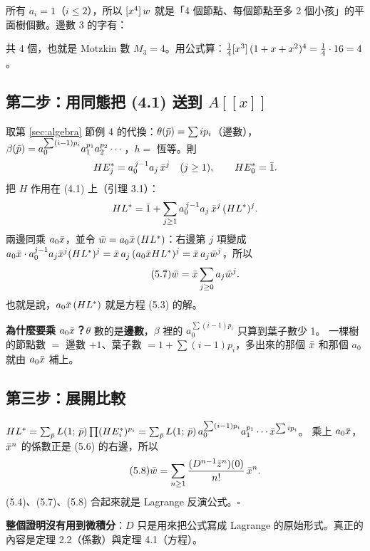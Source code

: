 \begin{exbox}[例：$\phi=1+x+x^2$，$n=4$]
所有 $a_i=1$（$i\le2$），所以 $[x^4]\,w$ 就是「4 個節點、每個節點至多 2 個小孩」的平面樹個數。邊數 3 的字有：
\begin{center}
\RanMotzkin
\end{center}
共 4 個，也就是 Motzkin 數 $M_3=4$。用公式算：$\frac14[x^3]\,(1+x+x^2)^4=\frac14\cdot16=4$。
\end{exbox}

\subsection{第二步：用同態把 (4.1) 送到 $A[[x]]$}

取第 \ref{sec:algebra} 節例 4 的代換：$\theta(\bar p)=\sum ip_i$（邊數），$\beta(\bar p)=a_0^{\sum(i-1)p_i}a_1^{p_1}a_2^{p_2}\cdots$，$h=$ 恆等。則 
\[
HE_j^*=a_0^{\,j-1}a_j\,\bar x^j\quad(j\ge1),\qquad HE_0^*=\bar1 .
\]
把 $H$ 作用在 (4.1) 上（引理 3.1）：
\[
HL^{*}=\bar1+\sum_{j\ge1}a_0^{\,j-1}a_j\,\bar x^j\,(HL^{*})^j .
\]
兩邊同乘 $a_0\bar x$，並令 $\bar w=a_0\bar x\,(HL^{*})$：右邊第 $j$ 項變成 $a_0\bar x\cdot a_0^{j-1}a_j\bar x^j(HL^{*})^j=\bar x\,a_j\,(a_0\bar x HL^{*})^j=\bar x\,a_j\bar w^j$，所以
\begin{equation}\tag{5.7}
\bar w=\bar x\sum_{j\ge0}a_j\bar w^j .
\end{equation}
也就是說，$a_0\bar x\,(HL^{*})$ 就是方程 (5.3) 的解。

\textbf{為什麼要乘 $a_0\bar x$？}$\theta$ 數的是\textbf{邊數}，$\beta$ 裡的 $a_0^{\sum(i-1)p_i}$ 只算到葉子數少 1。
一棵樹的節點數 $=$ 邊數 $+1$、葉子數 $=1+\sum(i-1)p_i$，多出來的那個 $\bar x$ 和那個 $a_0$ 就由 $a_0\bar x$ 補上。

\subsection{第三步：展開比較}

$HL^{*}=\sum_{\bar p}L(1;\,\bar p)\prod(HE_i^*)^{p_i}=\sum_{\bar p}L(1;\,\bar p)\,a_0^{\sum(i-1)p_i}a_1^{p_1}\cdots\bar x^{\sum ip_i}$。
乘上 $a_0\bar x$，$\bar x^n$ 的係數正是 (5.6) 的右邊，所以 
\begin{equation}\tag{5.8}
\bar w=\sum_{n\ge1}\frac{(D^{n-1}\bar z^n)(0)}{n!}\,\bar x^n .
\end{equation}
(5.4)、(5.7)、(5.8) 合起來就是 Lagrange 反演公式。\hfill$\square$

\textbf{整個證明沒有用到微積分}：$D$ 只是用來把公式寫成 Lagrange 的原始形式。真正的內容是定理 2.2（係數）與定理 4.1（方程）。

